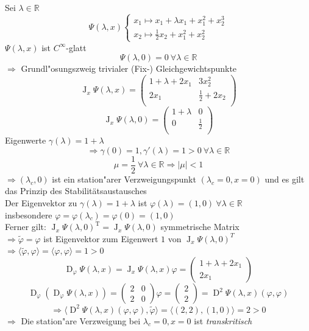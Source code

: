 \documentclass[a4paper, 13pt]{scrreprt}
\theoremstyle{definition} \newtheorem{definition}{Definition}[section]
\newenvironment{beispiel}[1][Beispiel]{\begin{trivlist}
\item[\hskip \labelsep {\bfseries #1}]}{\end{trivlist}}
\begin{document}
\begin{beispiel}
Sei $\lambda\in\mathbb{R}$
\[\Psi(\lambda,x) \begin{cases}
x_1\mapsto x_1+\lambda x_1+x_1^2+x_2^3\\
x_2\mapsto \frac 1 2 x_2+x_1^2+x_2^2
\end{cases}\]
$\Psi(\lambda,x)$ ist $C^{\infty}$-glatt\\
\[\Psi(\lambda,0)=0\ \forall\lambda\in\mathbb{R}\]
$\Rightarrow$ Grundl"osungszweig trivialer (Fix-) Gleichgewichtspunkte\\
\[\operatorname{J}_x\Psi(\lambda,x)=\begin{pmatrix}
1+\lambda+2x_1 & 3x_2^2\\
2x_1 & \frac 1 2 +2x_2\\
\end{pmatrix}\]
\[\operatorname{J}_x\Psi(\lambda,0)=\begin{pmatrix}
1+\lambda & 0\\
0 & \frac 1 2\\
\end{pmatrix}\]
Eigenwerte $\gamma(\lambda)=1+\lambda$
\[\Rightarrow \gamma(0)=1, \gamma'(\lambda)=1>0\ \forall \lambda\in\mathbb{R}\]
\[\mu=\frac 1 2\ \forall \lambda\in\mathbb{R} \Rightarrow |\mu|<1\]
$\Rightarrow (\lambda_c,0)$ ist ein station"arer Verzweigungspunkt $(\lambda_c =0, x=0)$ und es gilt das Prinzip des Stabilitätsaustausches\\
Der Eigenvektor zu $\gamma(\lambda)=1+\lambda$ ist $\varphi(\lambda)=(1,0)\ \forall \lambda\in\mathbb{R}$\\
insbesondere $\varphi =\varphi(\lambda_c)=\varphi(0)=(1,0)$\\
Ferner gilt: $\operatorname{J}_x\Psi(\lambda,0)^{\operatorname{T}}=\operatorname{J}_x\Psi(\lambda,0)$ symmetrische Matrix\\
$\Rightarrow \tilde{\varphi}=\varphi$ ist Eigenvektor zum Eigenwert $1$ von $\operatorname{J}_x\Psi(\lambda,0)^T$\\
$\Rightarrow \langle\tilde{\varphi},\varphi\rangle=\langle\varphi,\varphi\rangle =1>0$
\[\operatorname{D}_{\varphi}\Psi(\lambda,x)=\operatorname{J}_x\Psi(\lambda,x)\varphi=\begin{pmatrix}1+\lambda+2x_1\\ 2x_1 \end{pmatrix}\]
\[\operatorname{D}_{\varphi}(\operatorname{D}_{\varphi}\Psi(\lambda,x))=\begin{pmatrix}2 & 0\\ 2& 0\end{pmatrix}\varphi =\begin{pmatrix}2 \\ 2 \end{pmatrix} =\operatorname{D}^2\Psi(\lambda,x)(\varphi,\varphi)\]
\[\Rightarrow \langle \operatorname{D}^2 \Psi(\lambda,x)(\varphi,\varphi),\tilde{\varphi}\rangle =\langle (2,2),(1,0)\rangle=2>0
\]
$\Rightarrow$ Die station"are Verzweigung bei $\lambda_c=0, x=0$ ist \emph{transkritisch}
\end{beispiel}
\end{document}
